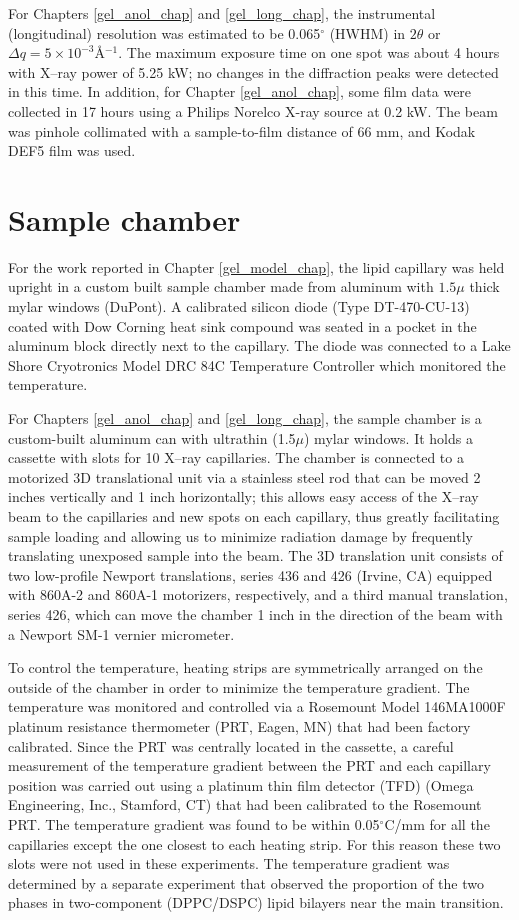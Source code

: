 For Chapters \ref{gel_anol_chap} and \ref{gel_long_chap},
the instrumental (longitudinal) resolution was estimated to be
0.065$^{\circ}$ (HWHM) in $2 \theta$ or $\Delta q = 5 \times 
10^{-3}$\AA$^{-1}$. The maximum exposure time on one spot was about 
4 hours with X--ray power of 5.25 kW; no changes in the diffraction 
peaks were detected in this time. In addition, 
for Chapter \ref{gel_anol_chap}, some film data were collected in 17 hours 
using a Philips Norelco X-ray source at 0.2 kW. The beam was pinhole 
collimated with a sample-to-film distance of 66 mm, and Kodak DEF5 
film was used.

\section{Sample chamber}

For the work reported in Chapter \ref{gel_model_chap},
the lipid capillary was held upright in a custom built sample chamber made 
from aluminum with $1.5\mu$ thick mylar windows (DuPont).  A calibrated 
silicon diode (Type DT-470-CU-13) coated with Dow Corning heat sink compound 
was seated in a pocket in the aluminum block directly next to the capillary. 
The diode was connected to a Lake Shore Cryotronics Model DRC 84C Temperature
Controller which monitored the temperature.

For Chapters \ref{gel_anol_chap} and \ref{gel_long_chap},
the sample chamber is a custom-built aluminum can 
with ultrathin (1.5$\mu$) mylar windows.  It
holds a cassette with slots for 10 X--ray capillaries. The chamber is connected
to a motorized 3D translational unit via 
a stainless steel rod that can be moved 2 inches vertically and 1 inch 
horizontally; this allows easy access of the X--ray
beam to the capillaries and new spots on each capillary, thus greatly
facilitating sample loading and allowing us to minimize radiation damage 
by frequently translating unexposed sample into the beam. 
The 3D translation unit consists of two low-profile Newport translations, 
series 436 and 426 (Irvine, CA) equipped with 860A-2 and 860A-1 motorizers, 
respectively, and a third manual translation, series 426, which can move 
the chamber 1 inch in the direction of the beam with a Newport SM-1
vernier micrometer.

To control the temperature, heating strips are symmetrically arranged on the 
outside of the chamber in order to minimize the temperature gradient. 
The temperature was monitored and controlled via a Rosemount Model 
146MA1000F platinum resistance thermometer (PRT, Eagen, MN) that had 
been factory calibrated. Since the PRT was centrally located in the cassette, 
a careful measurement of the temperature gradient between the PRT and each 
capillary position was carried out using a platinum thin film detector 
(TFD) (Omega Engineering, Inc., Stamford, CT) that had been calibrated to 
the Rosemount PRT. The temperature gradient was found to
be within 0.05$^{\circ}$C/mm for all the capillaries except the one closest 
to each heating strip. For this reason these two slots were not used in these 
experiments. The temperature gradient was determined by a separate experiment 
that observed the proportion of the two phases in two-component (DPPC/DSPC)
lipid bilayers near the main transition.

